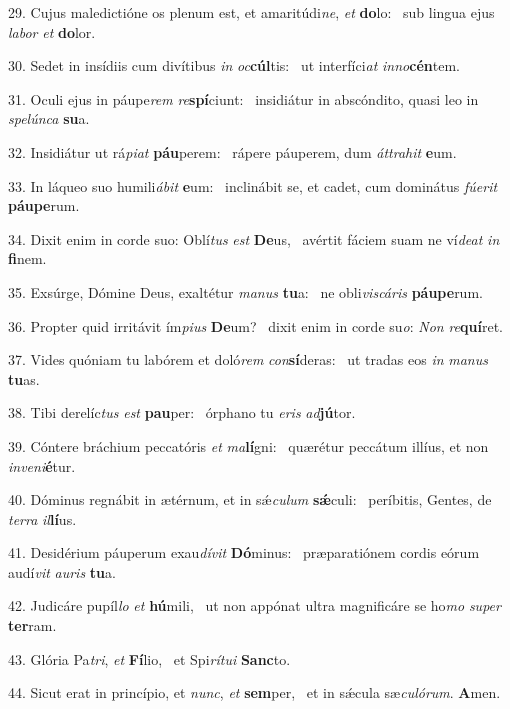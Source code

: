 29. Cujus maledictióne os plenum est, et amaritúdi\textit{ne}, \textit{et} \textbf{do}lo: \ast\  sub lingua ejus \textit{la}\textit{bor} \textit{et} \textbf{do}lor.\

30. Sedet in insídiis cum divítibus \textit{in} \textit{oc}\textbf{cúl}tis: \ast\  ut interfíci\textit{at} \textit{in}\textit{no}\textbf{cén}tem.\

31. Oculi ejus in páupe\textit{rem} \textit{re}\textbf{spí}ciunt: \ast\  insidiátur in abscóndito, quasi leo in \textit{spe}\textit{lún}\textit{ca} \textbf{su}a.\

32. Insidiátur ut rá\textit{pi}\textit{at} \textbf{páu}perem: \ast\  rápere páuperem, dum \textit{át}\textit{tra}\textit{hit} \textbf{e}um.\

33. In láqueo suo humili\textit{á}\textit{bit} \textbf{e}um: \ast\  inclinábit se, et cadet, cum dominátus \textit{fú}\textit{e}\textit{rit} \textbf{páu}\textbf{pe}rum.\

34. Dixit enim in corde suo: Oblí\textit{tus} \textit{est} \textbf{De}us, \ast\  avértit fáciem suam ne ví\textit{de}\textit{at} \textit{in} \textbf{fi}nem.\

35. Exsúrge, Dómine Deus, exaltétur \textit{ma}\textit{nus} \textbf{tu}a: \ast\  ne obli\textit{vis}\textit{cá}\textit{ris} \textbf{páu}\textbf{pe}rum.\

36. Propter quid irritávit ím\textit{pi}\textit{us} \textbf{De}um? \ast\  dixit enim in corde su\textit{o}: \textit{Non} \textit{re}\textbf{quí}ret.\

37. Vides quóniam tu labórem et doló\textit{rem} \textit{con}\textbf{sí}deras: \ast\  ut tradas eos \textit{in} \textit{ma}\textit{nus} \textbf{tu}as.\

38. Tibi derelíc\textit{tus} \textit{est} \textbf{pau}per: \ast\  órphano tu \textit{e}\textit{ris} \textit{ad}\textbf{jú}tor.\

39. Cóntere bráchium peccatóris \textit{et} \textit{ma}\textbf{lí}gni: \ast\  quærétur peccátum illíus, et non \textit{in}\textit{ve}\textit{ni}\textbf{é}tur.\

40. Dóminus regnábit in ætérnum, et in sǽ\textit{cu}\textit{lum} \textbf{sǽ}culi: \ast\  períbitis, Gentes, de \textit{ter}\textit{ra} \textit{il}\textbf{lí}us.\

41. Desidérium páuperum exau\textit{dí}\textit{vit} \textbf{Dó}minus: \ast\  præparatiónem cordis eórum audí\textit{vit} \textit{au}\textit{ris} \textbf{tu}a.\

42. Judicáre pupíl\textit{lo} \textit{et} \textbf{hú}mili, \ast\  ut non appónat ultra magnificáre se ho\textit{mo} \textit{su}\textit{per} \textbf{ter}ram.\

43. Glória Pa\textit{tri}, \textit{et} \textbf{Fí}lio, \ast\  et Spi\textit{rí}\textit{tu}\textit{i} \textbf{Sanc}to.\

44. Sicut erat in princípio, et \textit{nunc}, \textit{et} \textbf{sem}per, \ast\  et in sǽcula sæ\textit{cu}\textit{ló}\textit{rum}. \textbf{A}men.\

